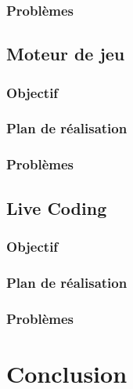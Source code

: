 \documentclass{report}
\begin{document}
\subsection{Problèmes}
\section{Moteur de jeu}
\subsection{Objectif}
\subsection{Plan de réalisation}
\subsection{Problèmes}
\section{Live Coding}
\subsection{Objectif}
\subsection{Plan de réalisation}
\subsection{Problèmes}

\chapter{Conclusion}


\printbibliography
\end{document}
